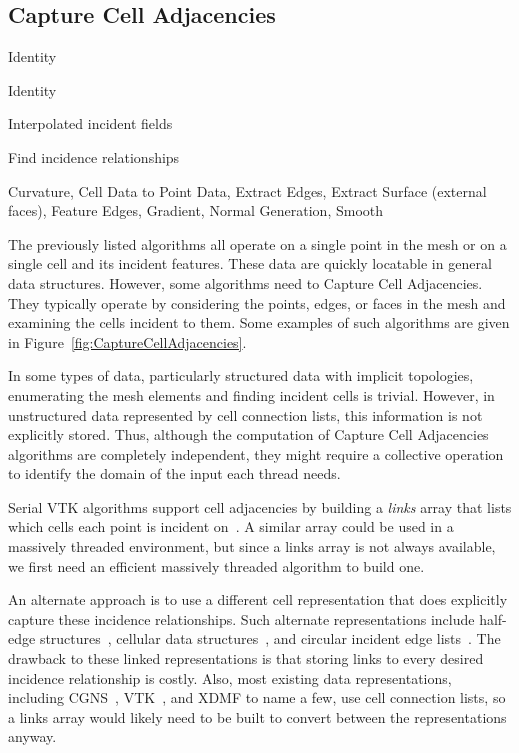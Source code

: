 \documentclass{sig-alternate}
\newcommand*{\lcite}[1]{~\cite{#1}}
\newcommand*{\keyterm}[1]{\emph{#1}}
\newcommand{\algclass}[1]{\textsf{#1}}
\newcommand{\algorithmclasssection}[1]{\subsection*{#1}}
\newcommand{\algorithmclass}[6]{
  \algorithmclasssection{#1} %
  \begin{description}[leftmargin=9em,style=nextline,noitemsep]
    \raggedright
  \item[Point Mapping] #2
  \item[Cell Mapping] #3
  \item[Field Mapping] #4
  \item[Collective Work] #5
  \item[Algorithms] #6
  \end{description}
}
\begin{document}
\algorithmclass{Capture Cell Adjacencies}
               {Identity} %
               {Identity} %
               {Interpolated incident fields} %
               {Find incidence relationships} %
               {
                 Curvature,
                 Cell Data to Point Data,
                 Extract Edges,
                 Extract Surface (external faces),
                 Feature Edges,
                 Gradient,
                 Normal Generation,
                 Smooth
               }

\noindent
The previously listed algorithms all operate on a single point in the mesh
or on a single cell and its incident features. These data are quickly
locatable in general data structures. However, some algorithms need to
\algclass{Capture Cell Adjacencies}. They typically operate by considering
the points, edges, or faces in the mesh and examining the cells incident to
them. Some examples of such algorithms are given in
Figure~\ref{fig:CaptureCellAdjacencies}.

In some types of data, particularly structured data with implicit
topologies, enumerating the mesh elements and finding incident cells is
trivial. However, in unstructured data represented by cell connection
lists, this information is not explicitly stored. Thus, although the
computation of \algclass{Capture Cell Adjacencies} algorithms are
completely independent, they might require a collective operation to
identify the domain of the input each thread needs.

Serial VTK algorithms support cell adjacencies by building a
\keyterm{links} array that lists which cells each point is incident
on\lcite{VTKUsersGuide}. A similar array could be used in a massively
threaded environment, but since a links array is not always available, we
first need an efficient massively threaded algorithm to build one.

An alternate approach is to use a different cell representation that does
explicitly capture these incidence relationships. Such alternate
representations include half-edge structures\lcite{Kettner1998}, cellular
data structures\lcite{Alumbaugh2005}, and circular incident edge
lists\lcite{Levy2001}. The drawback to these linked representations is that
storing links to every desired incidence relationship is costly. Also, most
existing data representations, including CGNS\lcite{CGNS}, VTK\lcite{VTK},
and XDMF to name a few, use cell connection lists, so a links array would
likely need to be built to convert between the representations anyway.
\end{document}
